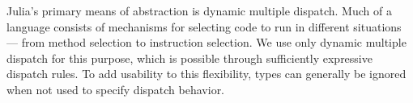 \documentclass[9pt]{sigplanconf}
\begin{document}




Julia's primary means of abstraction is dynamic multiple dispatch.
Much of a language consists of mechanisms for selecting
code to run in different situations --- from method selection to
instruction selection. We use only dynamic multiple dispatch for this
purpose, which is possible through sufficiently expressive
dispatch rules. To add usability to this flexibility,
types can generally be ignored when not used to specify dispatch behavior.
\end{document}
